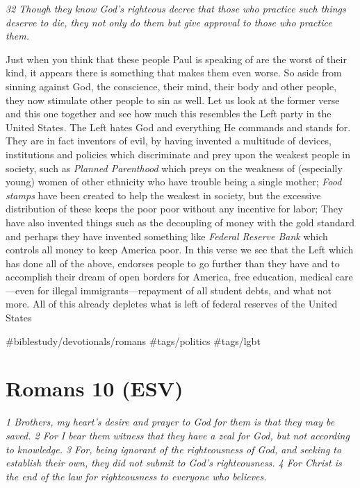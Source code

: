 \emph{32 Though they know God's righteous decree that those who practice
such things deserve to die, they not only do them but give approval to
those who practice them.}

Just when you think that these people Paul is speaking of are the worst
of their kind, it appears there is something that makes them even worse.
So aside from sinning against God, the conscience, their mind, their
body and other people, they now stimulate other people to sin as well.
Let us look at the former verse and this one together and see how much
this resembles the Left party in the United States. The Left hates God
and everything He commands and stands for. They are in fact inventors of
evil, by having invented a multitude of devices, institutions and
policies which discriminate and prey upon the weakest people in society,
such as \emph{Planned Parenthood} which preys on the weakness of
(especially young) women of other ethnicity who have trouble being a
single mother; \emph{Food stamps} have been created to help the weakest
in society, but the excessive distribution of these keeps the poor poor
without any incentive for labor; They have also invented things such as
the decoupling of money with the gold standard and perhaps they have
invented something like \emph{Federal Reserve Bank} which controls all
money to keep America poor. In this verse we see that the Left which has
done all of the above, endorses people to go further than they have and
to accomplish their dream of open borders for America, free education,
medical care---even for illegal immigrants---repayment of all student
debts, and what not more. All of this already depletes what is left of
federal reserves of the United States

\#biblestudy/devotionals/romans \#tags/politics \#tags/lgbt

\hypertarget{romans-10-esv}{%
\section{Romans 10 (ESV)}\label{romans-10-esv}}

\emph{1 Brothers, my heart's desire and prayer to God for them is that
they may be saved. 2 For I bear them witness that they have a zeal for
God, but not according to knowledge. 3 For, being ignorant of the
righteousness of God, and seeking to establish their own, they did not
submit to God's righteousness. 4 For Christ is the end of the law for
righteousness to everyone who believes.}

